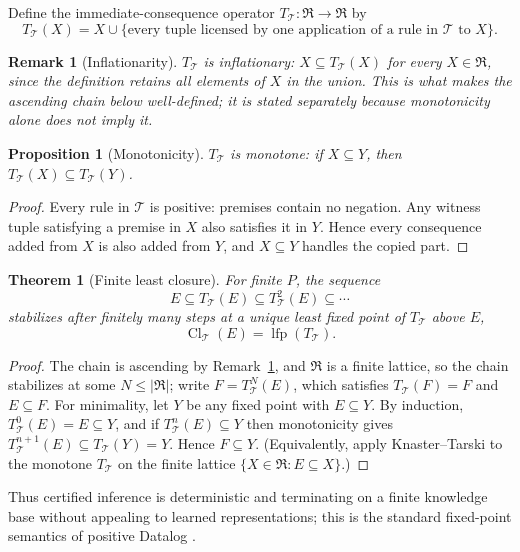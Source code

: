 \documentclass[11pt]{article}
\newtheorem{proposition}[definition]{Proposition}
\newtheorem{theorem}[definition]{Theorem}
\newtheorem{remark}[definition]{Remark}
\newcommand{\Cl}{\operatorname{Cl}}
\newcommand{\T}{\mathcal{T}}
\begin{document}
Define the immediate-consequence operator $T_{\T}:\mathfrak{R}\to\mathfrak{R}$ by
\[
T_{\T}(X)=X\cup\{\text{every tuple licensed by one application of a rule in }\T\text{ to }X\}.
\]
\begin{remark}[Inflationarity]
\label{rem:inflationary}
$T_{\T}$ is \emph{inflationary}: $X\subseteq T_{\T}(X)$ for every $X\in\mathfrak{R}$, since the definition retains all elements of $X$ in the union. This is what makes the ascending chain below well-defined; it is stated separately because monotonicity alone does not imply it.
\end{remark}

\begin{proposition}[Monotonicity]
$T_{\T}$ is monotone: if $X\subseteq Y$, then $T_{\T}(X)\subseteq T_{\T}(Y)$.
\end{proposition}
\begin{proof}
Every rule in $\T$ is positive: premises contain no negation. Any witness tuple satisfying a premise in $X$ also satisfies it in $Y$. Hence every consequence added from $X$ is also added from $Y$, and $X\subseteq Y$ handles the copied part.
\end{proof}

\begin{theorem}[Finite least closure]
\label{thm:closure}
For finite $P$, the sequence
\[
E\subseteq T_{\T}(E)\subseteq T_{\T}^{2}(E)\subseteq\cdots
\]
stabilizes after finitely many steps at a unique least fixed point of $T_{\T}$ above $E$,
\[
\Cl_{\T}(E)=\operatorname{lfp}(T_{\T}).
\]
\end{theorem}
\begin{proof}
The chain is ascending by Remark~\ref{rem:inflationary}, and $\mathfrak{R}$ is a finite lattice, so the chain stabilizes at some $N\le|\mathfrak{R}|$; write $F=T_{\T}^{N}(E)$, which satisfies $T_{\T}(F)=F$ and $E\subseteq F$. For minimality, let $Y$ be any fixed point with $E\subseteq Y$. By induction, $T_{\T}^{0}(E)=E\subseteq Y$, and if $T_{\T}^{n}(E)\subseteq Y$ then monotonicity gives $T_{\T}^{n+1}(E)\subseteq T_{\T}(Y)=Y$. Hence $F\subseteq Y$. (Equivalently, apply Knaster--Tarski to the monotone $T_{\T}$ on the finite lattice $\{X\in\mathfrak{R}:E\subseteq X\}$.)
\end{proof}

Thus certified inference is deterministic and terminating on a finite knowledge base without appealing to learned representations; this is the standard fixed-point semantics of positive Datalog \citep{abiteboul1995}.
\end{document}
